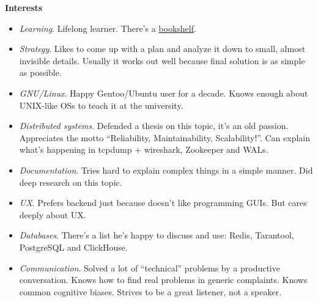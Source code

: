 \documentclass[final]{letter}
\begin{document}
{\bf Interests}
\begin{itemize}
  \item \textit{Learning}. Lifelong learner. There's a \href{https://www.goodreads.com/review/list/43338630-sergey-machulskis?shelf=professional}{bookshelf}.
  \item \textit{Strategy}. Likes to come up with a plan and analyze it down to small, almost invisible details.
    Usually it works out well because final solution is as simple as possible.
  \item \textit{GNU/Linux}. Happy Gentoo/Ubuntu user for a decade. Knows enough about UNIX-like OSs to teach it at the university.
  \item \textit{Distributed systems}. Defended a thesis on this topic, it's an old passion. Appreciates the motto ``Reliability, Maintainability, Scalability!''.
    Can explain what's happening in tcpdump + wireshark, Zookeeper and WALs.
  \item \textit{Documentation}. Tries hard to explain complex things in a simple manner. Did deep research on this topic.
  \item \textit{UX}. Prefers backend just because doesn't like programming GUIs. But cares deeply about UX.
  \item \textit{Databases}. There's a list he's happy to discuss and use: Redis, Tarantool, PostgreSQL and ClickHouse.
  \item \textit{Communication}. Solved a lot of ``technical'' problems by a productive conversation. Knows how to find real problems in generic complaints.
    Knows common cognitive biases. Strives to be a great listener, not a speaker.
\end{itemize}
\end{document}
